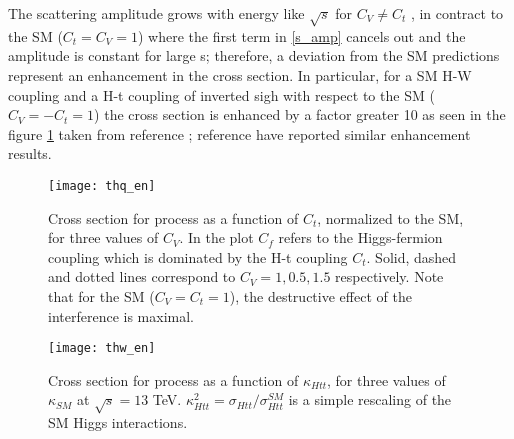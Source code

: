 \noindent The scattering amplitude grows with energy like $\sqrt{s}$ for $C_V \neq C_t$ , in contract to the SM ($C_t=C_V=1$) where the first term in \ref{s_amp} cancels out and the amplitude is constant for large s; therefore, a deviation from the SM predictions represent an enhancement in the \tHq cross section. In particular, for a SM H-W coupling and a H-t coupling of inverted sigh with respect to the SM ($C_V =-C_t=1$) the \tHq cross section is enhanced by a factor greater 10 as seen in the figure \ref{thq_en} taken from reference \cite{farina}; reference \cite{biswas2} have reported similar enhancement results.

\begin{figure}[h!]
\centering
\texttt{[image: thq\_en]}\\
\caption[Cross section for tHq process as a function of $C_t$]{Cross section for \tHq process as a function of $C_t$, normalized to the SM, for three values of $C_V$. In the plot $C_f$ refers to the Higgs-fermion coupling which is dominated by the H-t coupling $C_t$. Solid, dashed and dotted lines correspond to $C_V= 1, 0.5, 1.5$ respectively. Note that for the SM ($C_V=C_t=1$), the destructive effect of the interference is maximal.} 
\label{thq_en}
\end{figure}

\begin{figure}[h!]
\centering
\texttt{[image: thw\_en]}\\
\caption[Cross section for \tHW process as a function of $\kappa_{Htt}$]{Cross section for \tHW process as a function of $\kappa_{Htt}$, for three values of $\kappa_{SM}$ at $\sqrt{s}=13$ TeV. $\kappa_{Htt}^2=\sigma_{Htt}/\sigma_{Htt}^{SM}$ is a simple rescaling of the SM Higgs interactions.} 
\label{thw_en}
\end{figure}

